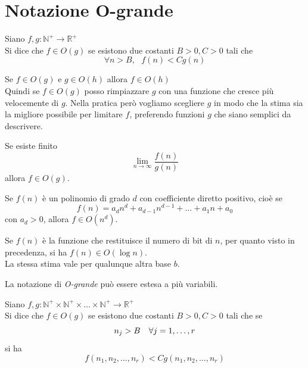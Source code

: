 \documentclass[a4paper,12pt, oneside]{book}
\begin{document}
	\section{Notazione O-grande}
		\begin{definizione}
			Siano $f,g : \mathbb{N}^{+} \rightarrow \mathbb{R}^{+}$\\
			Si dice che $f \in O(g)$ se esistono due costanti $B>0, C>0$ tali che $$\forall n > B, \mbox{  } f(n) < Cg(n)$$
		\end{definizione}
		\begin{osservazione}
			Se $f \in O(g)$ e $g \in O(h)$ allora $f \in O(h)$\\
			Quindi se $f \in O(g)$ posso rimpiazzare $g$ con una funzione che cresce più velocemente di $g$. Nella pratica però vogliamo scegliere $g$ in modo che la stima sia la migliore possibile per limitare $f$, preferendo funzioni $g$ che siano semplici da descrivere.
		\end{osservazione}
		\begin{osservazione}
			Se esiste finito $$ \lim_{n \to \infty} \frac{f(n)}{g(n)} $$ allora $f \in O(g)$.
		\end{osservazione}
		\begin{osservazione}
			Se $f(n)$ è un polinomio di grado $d$ con coefficiente diretto positivo, cioè se $$f(n) = a_{d} n^{d} + a_{d-1} n^{d-1} + \dots + a_{1} n + a_0$$ con $a_d > 0$, allora $f \in O(n^d)$.
		\end{osservazione}
		\begin{osservazione}
			Se $f(n)$ è la funzione che restituisce il numero di bit di $n$, per quanto visto in precedenza, si ha $f(n) \in O(\log n)$.\\
			La stessa stima vale per qualunque altra base $b$.
		\end{osservazione}
		La notazione di \textit{O-grande} può essere estesa a più variabili.
		\begin{definizione}
			Siano $f,g : \mathbb{N}^{+} \times \mathbb{N}^{+} \times \dots \times \mathbb{N}^{+} \rightarrow \mathbb{R}^{+}$\\
			Si dice che $f \in O(g)$ se esistono due costanti $B>0, C>0$ tali che se $$n_j > B \mbox{ \space\space} \forall j = 1, \dots, r$$ si ha $$f(n_1,n_2,\dots,n_r) < Cg(n_1,n_2,\dots,n_r)$$
		\end{definizione}
\end{document}
